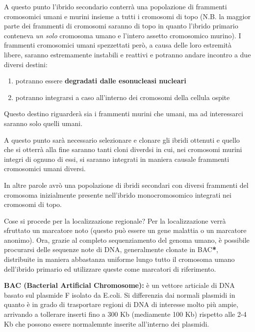 \documentclass[11pt]{book}
\begin{document}
A questo punto l'ibrido secondario conterrà una popolazione di frammenti cromosomici umani e murini insieme a tutti i cromosomi di topo (N.B. la maggior parte dei frammenti di cromosomi saranno di topo in quanto l'ibrido primario conteneva \emph{un solo} cromosoma umano e l'intero assetto cromosomico murino). I frammenti cromosomici umani spezzettati però, a causa delle loro estremità libere, saranno estremamente instabili e reattivi e potranno andare incontro a due diversi destini:
\begin{enumerate}
\item potranno essere \textbf{degradati dalle esonucleasi nucleari}
\item potranno integrarsi a caso all'interno dei cromosomi della cellula ospite
\end{enumerate}

Questo destino riguarderà sia i frammenti murini che umani, ma ad interessarci saranno solo quelli umani.

A questo punto sarà necessario selezionare e clonare gli ibridi ottenuti e quello che si otterrà alla fine saranno tanti cloni diverdsi in cui, nei cromosomi murini integri di ognuno di essi, si saranno integrati in maniera causale frammenti cromosomici umani diversi.

In altre parole avrò una popolazione di ibridi secondari con diversi frammenti del cromosoma inizialmente presente nell’ibrido monocromosomico integrati nei cromosomi di topo.

Cose si procede per la localizzazione regionale?
Per la localizzazione verrà sfruttato un marcatore noto (questo può essere un gene malattia o un marcatore anonimo). Ora, grazie al completo sequenziamento del genoma umano, è possibile procurarsi delle sequenze note di DNA, generalmente clonate in BAC\textbf{*}, distribuite in maniera abbastanza uniforme lungo tutto il cromosoma umano dell'ibrido primario ed utilizzare queste come marcatori di riferimento.

\textbf{BAC (Bacterial Artificial Chromosome):} è un vettore articiale di DNA basato sul plasmide F isolato da E.coli. Si differenzia dai normali plasmidi in quanto è in grado di trasportare regioni di DNA di interesse molto più ampie, arrivando a tollerare inserti fino a 300 Kb (mediamente 100 Kb) rispetto alle 2-4 Kb che possono essere normalemnte inserite all'interno dei plasmidi.
\end{document}
